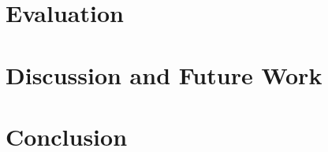 \documentclass[sigconf, anonymous]{acmart}
\begin{document}
\section{Evaluation}
\label{sec:evaluation}



\section{Discussion and Future Work}
\label{sec:discussion}

\section{Conclusion}

\newpage



\end{document}
